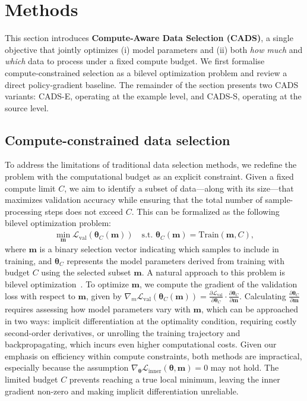 \section{Methods}  
\label{sec:methods}

This section introduces \textbf{Compute‑Aware Data Selection (CADS)}, a single objective that jointly optimizes (i) model parameters and (ii) both \textit{how much} and \textit{which} data to process under a fixed compute budget.  
We first formalise compute‑constrained selection as a bilevel optimization problem and review a direct policy‑gradient baseline.  
The remainder of the section presents two CADS variants: CADS-E, operating at the example level, and CADS-S, operating at the source level.

\subsection{Compute-constrained data selection}
To address the limitations of traditional data selection methods, we redefine the problem with the computational budget as an explicit constraint. Given a fixed compute limit \(C\), we aim to identify a subset of data—along with its size—that maximizes validation accuracy while ensuring that the total number of sample-processing steps does not exceed \(C\). This can be formalized as the following bilevel optimization problem:
\begin{equation}  
\label{eq:bilevel-m}
\begin{aligned}
\min_{\bm{m}} \mathcal{L}_{\mathrm{val}}(\bm{\theta}_C(\bm{m})) \quad \text{s.t. } \bm{\theta}_C(\bm{m}) = \text{Train}(\bm{m}, C),  
\end{aligned}  
\end{equation}  
where \(\bm{m}\) is a binary selection vector indicating which samples to include in training, and \(\bm{\theta}_C\) represents the model parameters derived from training with budget \(C\) using the selected subset \(\bm{m}\).
A natural approach to this problem is bilevel optimization~\cite{bi_domke2012generic, bi_franceschi2017forward, bi_grazzi2020iteration, bi_lorraine2020optimizing, bi_maclaurin2015gradient, bi_pedregosa2016hyperparameter, bi_shaban2019truncated}. To optimize \(\bm{m}\), we compute the gradient of the validation loss with respect to \(\bm{m}\), given by \(\nabla_m \mathcal{L}_{\mathrm{val}}(\bm{\theta}_C(\bm{m})) = \frac{\partial \mathcal{L}_{\mathrm{val}}}{\partial \bm{\theta}_C} \cdot \frac{\partial \bm{\theta}_C}{\partial \bm{m}}\).
Calculating \(\frac{\partial \bm{\theta}_C}{\partial \bm{m}}\) requires assessing how model parameters vary with \(\bm{m}\), which can be approached in two ways: implicit differentiation at the optimality condition, requiring costly second-order derivatives, or unrolling the training trajectory and backpropagating, which incurs even higher computational costs. Given our emphasis on efficiency within compute constraints, both methods are impractical, especially because the assumption \(\nabla_{\bm{\theta}} \mathcal{L}_{\text{inner}}(\bm{\theta}, \bm{m}) = 0\) may not hold. The limited budget \(C\) prevents reaching a true local minimum, leaving the inner gradient non-zero and making implicit differentiation unreliable.
